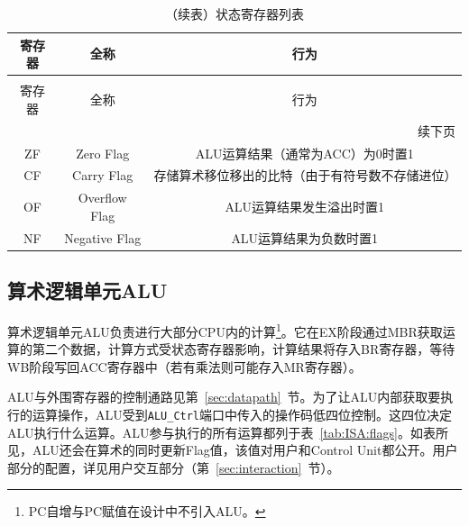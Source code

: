 \documentclass[lang=cn,a4paper,newtx]{elegantpaper}
\begin{document}
\begin{longtable}{c c c}
  \caption{状态寄存器列表} \label{tab:CPU:status} \\
  \toprule
  寄存器 & 全称 & 行为 \\ 
  \midrule
  \endfirsthead

  \caption[]{（续表）状态寄存器列表} \\
  \toprule
  寄存器 & 全称 & 行为\\
  \midrule
  \endhead

  \midrule
  \multicolumn{3}{r}{续下页} \\
  \midrule
  \endfoot

  \bottomrule
  \endlastfoot

  ZF   & Zero Flag             & ALU运算结果（通常为ACC）为0时置1\\
  CF  & Carry Flag     & 存储算术移位移出的比特（由于有符号数不存储进位）\\
  OF  & Overflow Flag &  ALU运算结果发生溢出时置1\\
  NF  & Negative Flag &  ALU运算结果为负数时置1\\
\end{longtable}
\subsection{算术逻辑单元ALU}
算术逻辑单元ALU负责进行大部分CPU内的计算\footnote{PC自增与PC赋值在设计中不引入ALU。}。它在EX阶段通过MBR获取运算的第二个数据，计算方式受状态寄存器影响，计算结果将存入BR寄存器，等待WB阶段写回ACC寄存器中（若有乘法则可能存入MR寄存器）。

ALU与外围寄存器的控制通路见第~\ref{sec:datapath}~节。为了让ALU内部获取要执行的运算操作，ALU受到\texttt{ALU\_Ctrl}端口中传入的操作码低四位控制。这四位决定ALU执行什么运算。ALU参与执行的所有运算都列于表~\ref{tab:ISA:flags}。如表所见，ALU还会在算术的同时更新Flag值，该值对用户和Control Unit都公开。用户部分的配置，详见用户交互部分（第~\ref{sec:interaction}~节）。
\end{document}
